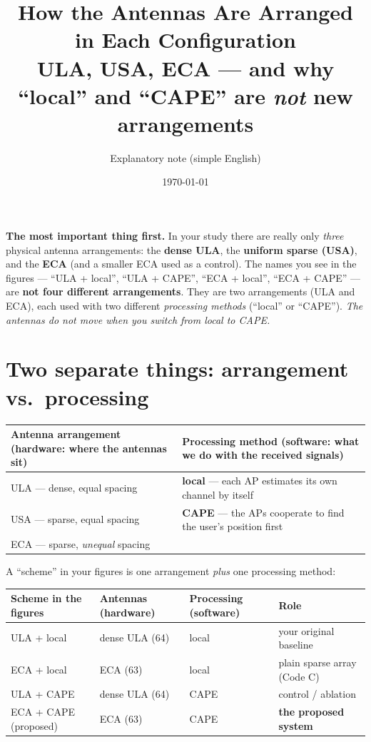\documentclass[11pt]{article}
\title{\textbf{How the Antennas Are Arranged in Each Configuration}\\[3pt]
\large ULA, USA, ECA --- and why ``local'' and ``CAPE'' are \emph{not} new arrangements}
\author{Explanatory note (simple English)}
\date{\today}
\begin{document}
\maketitle

\begin{keybox}
\textbf{The most important thing first.} In your study there are really only
\emph{three} physical antenna arrangements: the \textbf{dense ULA}, the \textbf{uniform sparse
(USA)}, and the \textbf{ECA} (and a smaller ECA used as a control). The names you see in the
figures --- ``ULA + local'', ``ULA + CAPE'', ``ECA + local'', ``ECA + CAPE'' --- are
\textbf{not four different arrangements}. They are two arrangements (ULA and ECA), each used with
two different \emph{processing methods} (``local'' or ``CAPE''). \emph{The antennas do not move
when you switch from local to CAPE.}
\end{keybox}

\section{Two separate things: arrangement vs.\ processing}

\begin{center}
\renewcommand{\arraystretch}{1.25}
\begin{tabular}{@{}p{4.6cm}p{10.0cm}@{}}
\toprule
\textbf{Antenna arrangement} (hardware: where the antennas sit) &
\textbf{Processing method} (software: what we do with the received signals)\\
\midrule
ULA --- dense, equal spacing & \textbf{local} --- each AP estimates its own channel by itself\\
USA --- sparse, equal spacing & \textbf{CAPE} --- the APs cooperate to find the user's position first\\
ECA --- sparse, \emph{unequal} spacing & \\
\bottomrule
\end{tabular}
\end{center}

A ``scheme'' in your figures is one arrangement \emph{plus} one processing method:

\begin{center}
\renewcommand{\arraystretch}{1.25}
\begin{tabular}{@{}lll l@{}}
\toprule
Scheme in the figures & Antennas (hardware) & Processing (software) & Role\\
\midrule
ULA + local        & dense ULA (64) & local & your original baseline\\
ECA + local        & ECA (63)       & local & plain sparse array (Code C)\\
ULA + CAPE          & dense ULA (64) & CAPE  & control / ablation\\
ECA + CAPE (proposed) & ECA (63)     & CAPE  & \textbf{the proposed system}\\
\bottomrule
\end{tabular}
\end{center}
\end{document}
